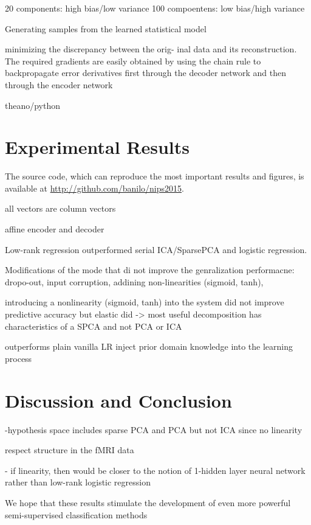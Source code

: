 \documentclass{article} %
\begin{document}
20 components: high bias/low variance
100 compoentens: low bias/high variance


Generating samples from the learned statistical model

minimizing the discrepancy between the orig- inal data and its reconstruction.
The required gradients are easily obtained by using the chain rule to
backpropagate error derivatives first through the decoder network
and then through the encoder network 

theano/python



\section{Experimental Results}
The source code, which can reproduce the most important results and
figures, is available at \url{http://github.com/banilo/nips2015}.

all vectors are column vectors

affine encoder and decoder

Low-rank regression outperformed serial ICA/SparsePCA and logistic regression.






Modifications of the mode that di not improve the genralization performacne:
dropo-out, input corruption, addining non-linearities (sigmoid, tanh),


introducing a
nonlinearity (sigmoid, tanh) into the system did not improve predictive accuracy but
elastic did -> most useful decomposition has characteristics of a SPCA
and not PCA or ICA

outperforms plain vanilla LR
inject prior domain knowledge into the learning process





\section{Discussion and Conclusion}
%

-hypothesis space includes sparse PCA and PCA but not ICA since no
linearity

respect structure in the fMRI data


- if linearity, then would be closer to the notion of 1-hidden layer neural
network rather than low-rank logistic regression



We hope that these results stimulate the development of
even more powerful semi-supervised classification methods
\end{document}
